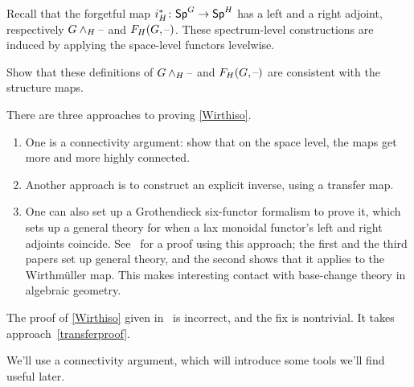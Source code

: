 Recall that the forgetful map $i_H^*\colon \mathsf{Sp}^G\to\mathsf{Sp}^H$ has a left and a right adjoint, respectively
$G\wedge_H\text{--}$ and $F_H(G,\text{--})$. These spectrum-level constructions are induced by applying the space-level
functors levelwise.
\begin{ex}
Show that these definitions of $G\wedge_H\text{--}$ and $F_H(G,\text{--})$ are consistent with the structure maps.
\end{ex}
There are three approaches to proving \cref{Wirthiso}.
\begin{enumerate}
	\item One is a connectivity argument: show that on the space level, the maps get more and more highly
	connected.
	\item\label{transferproof} Another approach is to construct an explicit inverse, using a transfer map.
	\item One can also set up a Grothendieck six-functor formalism to prove it, which sets up a general theory for
	when a lax monoidal functor's left and right adjoints coincide. See~\cite{FHM, WirthRevisited, BDS} for a proof
	using this approach; the first and the third papers set up general theory, and the second shows that it applies
	to the Wirthmüller map. This makes interesting contact with base-change theory in algebraic geometry.
\end{enumerate}
\begin{warn}
The proof of \cref{Wirthiso} given in~\cite{LMS} is incorrect, and the fix is nontrivial. It takes
approach~\eqref{transferproof}.
\end{warn}
We'll use a connectivity argument, which will introduce some tools we'll find useful later.
